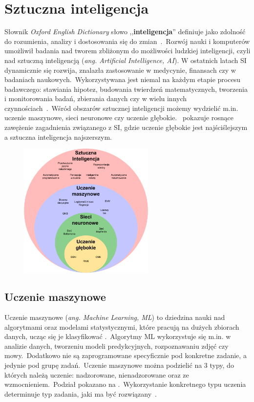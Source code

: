 \chapter{Sztuczna inteligencja}
Słownik \textit{Oxford English Dictionary} słowo ,,\textbf{inteligencja}'' definiuje jako zdolność do rozumienia, analizy i dostosowania się do zmian~\cite{OxfordJuly2023}.\ Rozwój nauki i komputerów umożliwił badania nad tworem zbliżonym do możliwości ludzkiej inteligencji, czyli nad sztuczną inteligencją (\textit{ang. Artificial Intelligence, AI}). W ostatnich latach SI dynamicznie się rozwija, znalazła zastosowanie w medycynie, finansach czy w badaniach naukowych.\ Wykorzystywana jest niemal na każdym etapie procesu badawczego: stawiania hipotez, budowania twierdzeń matematycznych, tworzenia i monitorowania badań, zbierania danych czy w wielu innych czynnościach~\cite{AiScience, Mahesh2018}.\ Wśród obszarów sztucznej inteligencji możemy wydzielić m.in. uczenie maszynowe, sieci neuronowe czy uczenie głębokie.\  pokazuje rosnące zawężenie zagadnienia związanego z SI, gdzie uczenie głębokie jest najściślejszym a sztuczna inteligencja najszerszym.

\begin{figure}[H]
    \centering
    \includegraphics[width=0.6\textwidth]{images/si}
    \label{fig:si-schema}
\end{figure}


\section{Uczenie maszynowe}
Uczenie maszynowe (\textit {ang. Machine Learning, ML}) to dziedzina nauki nad algorytmami oraz modelami statystycznymi, które pracują na dużych zbiorach danych, ucząc się je klasyfikować .\ Algorytmy ML wykorzystuje się m.in. w analizie danych, tworzeniu modeli predykcyjnych, rozpoznawaniu zdjęć czy mowy.\ Dodatkowo nie są zaprogramowane specyficznie pod konkretne zadanie, a jedynie pod grupę zadań.\ Uczenie maszynowe można podzielić na 3 typy, do których należą uczenie: nadzorowane, nienadzorowane oraz ze wzmocnieniem.\ Podział  pokazano na .\ Wykorzystanie konkretnego typu uczenia determinuje typ zadania, jaki ma być rozwiązany~\cite{Mahesh2018, LinkedInSi}.

